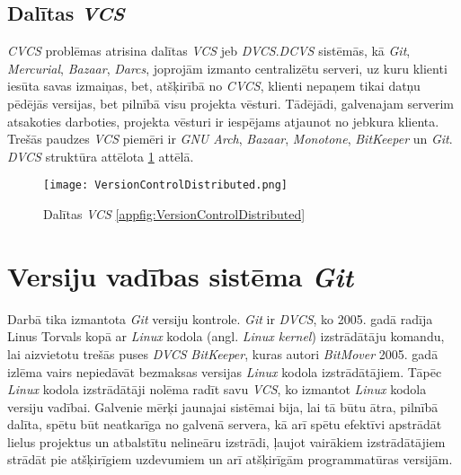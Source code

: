 \subsection{Dalītas \textit{VCS}}
\textit{CVCS} problēmas atrisina dalītas \textit{VCS} jeb \textit{DVCS}.\textit{DCVS} sistēmās, kā \textit{Git}, \textit{Mercurial}, \textit{Bazaar}, \textit{Darcs}, joprojām izmanto centralizētu serveri, uz kuru klienti iesūta savas izmaiņas, bet, atšķirībā no \textit{CVCS}, klienti nepaņem tikai datņu pēdējās versijas, bet pilnībā visu projekta vēsturi. Tādējādi, galvenajam serverim atsakoties darboties, projekta vēsturi ir iespējams atjaunot no jebkura klienta. Trešās paudzes \textit{VCS} piemēri ir \textit{GNU Arch}, \textit{Bazaar}, \textit{Monotone}, \textit{BitKeeper} un \textit{Git}. \textit{DVCS} struktūra attēlota \ref{fig:VersionControlDistributed} attēlā. \cite{chacon2014progit}
\begin{figure}[H]%
	\centering
	\captionsetup{justification=centering}
	\texttt{[image: VersionControlDistributed.png]}
	\caption{Dalītas \textit{VCS} \ref{appfig:VersionControlDistributed}}
	\label{fig:VersionControlDistributed}
\end{figure}

\section{Versiju vadības sistēma \textit{Git}}
Darbā tika izmantota \textit{Git} versiju kontrole. %
\textit{Git} ir \textit{DVCS}, ko 2005. gadā radīja Linus Torvals kopā ar \textit{Linux} kodola (angl. \textit{Linux kernel}) izstrādātāju komandu, lai aizvietotu trešās puses \textit{DVCS}  \textit{BitKeeper}, kuras autori \textit{BitMover} 2005. gadā izlēma vairs nepiedāvāt bezmaksas versijas  \textit{Linux} kodola izstrādātājiem. Tāpēc \textit{Linux} kodola izstrādātāji nolēma radīt savu \textit{VCS}, ko izmantot \textit{Linux} kodola versiju vadībai. Galvenie mērķi jaunajai sistēmai bija, lai tā būtu ātra, pilnībā dalīta, spētu būt neatkarīga no galvenā servera, kā arī spētu efektīvi apstrādāt lielus projektus un atbalstītu nelineāru izstrādi, ļaujot vairākiem izstrādātājiem strādāt pie atšķirīgiem uzdevumiem un arī atšķirīgām programmatūras versijām.

